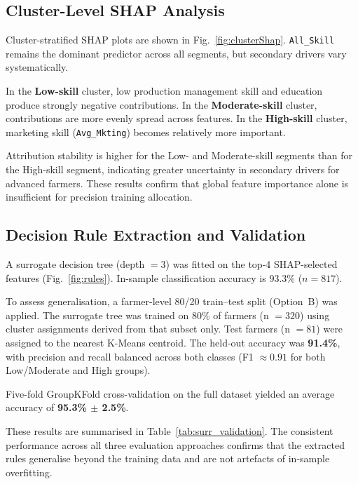 \documentclass[3p,twocolumn,authoryear]{elsarticle}
\begin{document}
\subsection{Cluster-Level SHAP Analysis}

Cluster-stratified SHAP plots are shown in Fig.~\ref{fig:clusterShap}.
\texttt{All\_Skill} remains the dominant predictor across all segments,
but secondary drivers vary systematically.

In the \textbf{Low-skill} cluster, low production management skill and
education produce strongly negative contributions.
In the \textbf{Moderate-skill} cluster, contributions are more evenly
spread across features.
In the \textbf{High-skill} cluster, marketing skill (\texttt{Avg\_Mkting})
becomes relatively more important.

Attribution stability is higher for the Low- and Moderate-skill segments
than for the High-skill segment, indicating greater uncertainty in
secondary drivers for advanced farmers.
These results confirm that global feature importance alone is insufficient
for precision training allocation.

\subsection{Decision Rule Extraction and Validation}

A surrogate decision tree (depth $= 3$) was fitted on the top-4
SHAP-selected features (Fig.~\ref{fig:rules}).
In-sample classification accuracy is 93.3\% ($n = 817$).

To assess generalisation, a farmer-level 80/20 train--test split
(Option~B) was applied.
The surrogate tree was trained on 80\% of farmers (n $= 320$) using
cluster assignments derived from that subset only.
Test farmers (n $= 81$) were assigned to the nearest K-Means centroid.
The held-out accuracy was \textbf{91.4\%}, with precision and recall
balanced across both classes (F1 $\approx 0.91$ for both Low/Moderate
and High groups).

Five-fold GroupKFold cross-validation on the full dataset yielded an
average accuracy of \textbf{95.3\% $\pm$ 2.5\%}.

These results are summarised in Table~\ref{tab:surr_validation}.
The consistent performance across all three evaluation approaches
confirms that the extracted rules generalise beyond the training data
and are not artefacts of in-sample overfitting.
\end{document}
